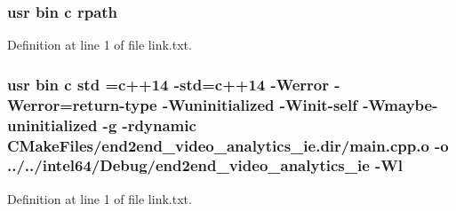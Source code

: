 \subsubsection[{\texorpdfstring{rpath}{rpath}}]{\setlength{\rightskip}{0pt plus 5cm}usr bin {\bf c} rpath}\hypertarget{end2end__video__analytics_2end2end__video__analytics__ie_2CMakeFiles_2end2end__video__analytics__ie_8dir_2link_8txt_ab9d7fd7120fafa2118a4e08c1df697c7}{}\label{end2end__video__analytics_2end2end__video__analytics__ie_2CMakeFiles_2end2end__video__analytics__ie_8dir_2link_8txt_ab9d7fd7120fafa2118a4e08c1df697c7}


Definition at line 1 of file link.\+txt.

\subsubsection[{\texorpdfstring{std}{std}}]{\setlength{\rightskip}{0pt plus 5cm}usr bin {\bf c} std ={\bf c}++14 -\/std={\bf c}++14 -\/Werror -\/Werror=return-\/type -\/Wuninitialized -\/Winit-\/self -\/Wmaybe-\/uninitialized -\/g -\/rdynamic C\+Make\+Files/end2end\+\_\+video\+\_\+analytics\+\_\+ie.\+dir/main.\+cpp.\+o -\/o ../../intel64/Debug/end2end\+\_\+video\+\_\+analytics\+\_\+ie -\/{\bf Wl}}\hypertarget{end2end__video__analytics_2end2end__video__analytics__ie_2CMakeFiles_2end2end__video__analytics__ie_8dir_2link_8txt_a1ccfea5f558575a112db71eeb271fabf}{}\label{end2end__video__analytics_2end2end__video__analytics__ie_2CMakeFiles_2end2end__video__analytics__ie_8dir_2link_8txt_a1ccfea5f558575a112db71eeb271fabf}


Definition at line 1 of file link.\+txt.

